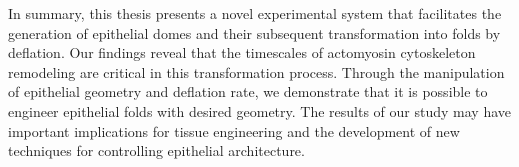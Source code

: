 In summary, this thesis presents a novel experimental system that facilitates the generation of epithelial domes and their subsequent transformation into folds by deflation. Our findings reveal that the timescales of actomyosin cytoskeleton remodeling are critical in this transformation process. Through the manipulation of epithelial geometry and deflation rate, we demonstrate that it is possible to engineer epithelial folds with desired geometry. The results of our study may have important implications for tissue engineering and the development of new techniques for controlling epithelial architecture.